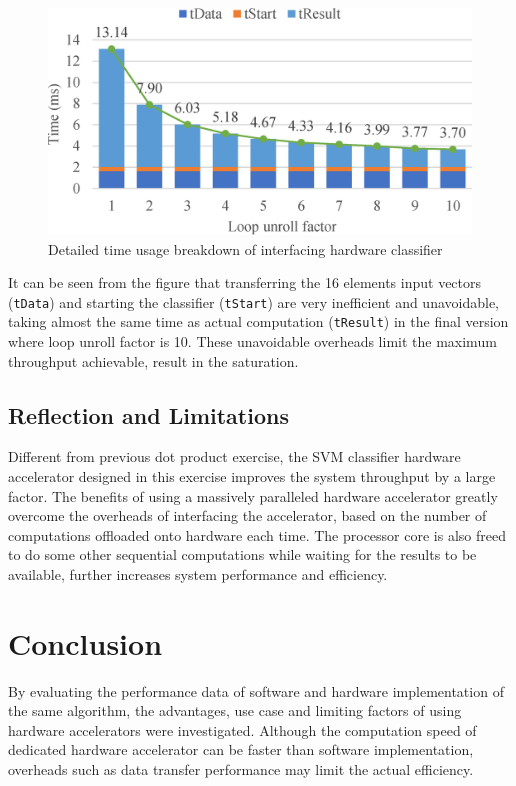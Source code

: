\documentclass[journal]{IEEEtran}
\begin{document}
\begin{figure}[ht]
	\centering
	\includegraphics[width=0.9\columnwidth]{time}
	\caption{Detailed time usage breakdown of interfacing hardware classifier}
	\label{fig:time}
\end{figure}

It can be seen from the figure that transferring the 16 elements input vectors (\texttt{tData}) and starting the classifier (\texttt{tStart}) are very inefficient and unavoidable, taking almost the same time as actual computation (\texttt{tResult}) in the final version where loop unroll factor is 10. These unavoidable overheads limit the maximum throughput achievable, result in the saturation.

\subsection{Reflection and Limitations}

Different from previous dot product exercise, the SVM classifier hardware accelerator designed in this exercise improves the system throughput by a large factor. The benefits of using a massively paralleled hardware accelerator greatly overcome the overheads of interfacing the accelerator, based on the number of computations offloaded onto hardware each time. The processor core is also freed to do some other sequential computations while waiting for the results to be available, further increases system performance and efficiency.

\section{Conclusion}

By evaluating the performance data of software and hardware implementation of the same algorithm, the advantages, use case and limiting factors of using hardware accelerators were investigated. Although the computation speed of dedicated hardware accelerator can be faster than software implementation, overheads such as data transfer performance may limit the actual efficiency.




\end{document}
